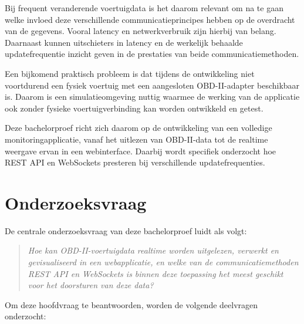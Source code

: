 Bij frequent veranderende voertuigdata is het daarom relevant om na te gaan
welke invloed deze verschillende communicatieprincipes hebben op de overdracht
van de gegevens. Vooral latency en netwerkverbruik zijn hierbij van belang.
Daarnaast kunnen uitschieters in latency en de werkelijk behaalde
updatefrequentie inzicht geven in de prestaties van beide
communicatiemethoden.

Een bijkomend praktisch probleem is dat tijdens de ontwikkeling niet voortdurend
een fysiek voertuig met een aangesloten OBD-II-adapter beschikbaar is. Daarom
is een simulatieomgeving nuttig waarmee de werking van de applicatie ook zonder
fysieke voertuigverbinding kan worden ontwikkeld en getest.

Deze bachelorproef richt zich daarom op de ontwikkeling van een volledige
monitoringapplicatie, vanaf het uitlezen van OBD-II-data tot de realtime
weergave ervan in een webinterface. Daarbij wordt specifiek onderzocht hoe
REST API en WebSockets presteren bij verschillende updatefrequenties.


\section{Onderzoeksvraag}

De centrale onderzoeksvraag van deze bachelorproef luidt als volgt:

\begin{quote}
\textit{Hoe kan OBD-II-voertuigdata realtime worden uitgelezen, verwerkt en
gevisualiseerd in een webapplicatie, en welke van de communicatiemethoden REST
API en WebSockets is binnen deze toepassing het meest geschikt voor het
doorsturen van deze data?}
\end{quote}

Om deze hoofdvraag te beantwoorden, worden de volgende deelvragen onderzocht:

